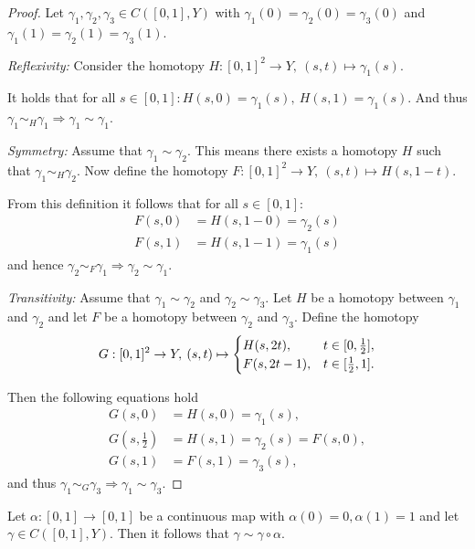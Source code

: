 \begin{proof}
  Let $\gamma_1, \gamma_2, \gamma_3 \in C([0,1],Y)$ with $\gamma_1(0) = \gamma_2(0) = \gamma_3(0)$ and $\gamma_1(1) = \gamma_2(1) = \gamma_3(1)$.
  
  \textit{Reflexivity:}
  Consider the homotopy $H\colon [0,1]^2 \to Y, \: (s, t) \mapsto \gamma_1(s)$. 
  
  It holds that for all $s\in [0,1]\colon H(s, 0) = \gamma_1(s),\: H(s, 1) = \gamma_1(s)$. And thus $\gamma_1 \sim_H \gamma_1 \Rightarrow \gamma_1 \sim \gamma_1$.

  \textit{Symmetry:} 
  Assume that $\gamma_1 \sim \gamma_2$. This means there exists a homotopy $H$ such that $\gamma_1 \sim_H \gamma_2$. 
  Now define the homotopy $F\colon [0,1]^2 \to Y, \: (s, t) \mapsto H(s, 1-t)$. 
  
  From this definition it follows that for all $s \in [0,1]:$
  \begin{align*}
    F(s, 0) &= H(s, 1 - 0) = \gamma_2(s) \\
    F(s, 1) &= H(s, 1 - 1) = \gamma_1(s)
  \end{align*}
  and hence $\gamma_2 \sim_F \gamma_1 \Rightarrow \gamma_2 \sim \gamma_1$.

  \textit{Transitivity:}
  Assume that $\gamma_1 \sim \gamma_2$ and $\gamma_2 \sim \gamma_3$. Let $H$ be a homotopy between $\gamma_1$ and $\gamma_2$ and let $F$ be a homotopy between $\gamma_2$ and $\gamma_3$. 
  Define the homotopy
  \begin{equation*} 
    G: [0,1]^2 \to Y, \: (s,t) \mapsto \begin{cases}
      H(s, 2t), &t \in [0, {1 \over 2}], \\
      F(s, 2t - 1), &t \in [{1 \over 2}, 1].
    \end{cases}
  \end{equation*}

  Then the following equations hold
  \begin{align*}
    G(s,0) &= H(s,0) = \gamma_1(s), \\
    G\left(s, \tfrac{1}{2}\right) &= H(s, 1) = \gamma_2(s) = F(s, 0), \\
    G(s, 1) &= F(s, 1) = \gamma_3(s),
  \end{align*}
  and thus $\gamma_1 \sim_G \gamma_3 \Rightarrow \gamma_1 \sim \gamma_3$.
\end{proof}

\begin{rem} \label{rem:reparam}
  Let $\alpha: [0,1] \to [0,1]$ be a continuous map with $\alpha(0) = 0, \alpha(1) = 1$ and let $\gamma \in C([0,1], Y)$. Then it follows that $\gamma \sim \gamma \circ \alpha$.
\end{rem}

